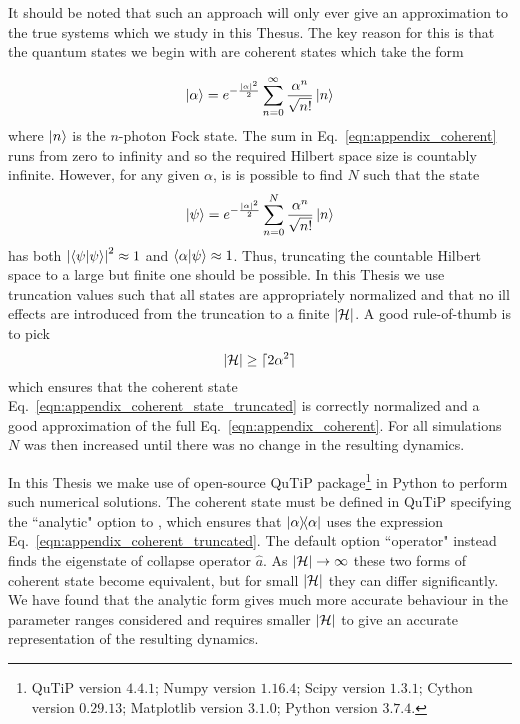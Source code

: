 It should be noted that such an approach will only ever give an approximation to the true systems which we study in this Thesus. The key reason for this is that the quantum states we begin with are coherent states which take the form

\begin{equation}\label{eqn:appendix_coherent}
\ket{\alpha} = e^{-\frac{\left|\alpha\right|^2}{2}}\sum_{n=0}^\infty \frac{\alpha^n}{\sqrt{n!}}\ket{n}
\end{equation}
where $\ket{n}$ is the $n$-photon Fock state. %
The sum in Eq.~\ref{eqn:appendix_coherent} runs from zero to infinity and so the required Hilbert space size is countably infinite. However, for any given $\alpha$, is is possible to find $N$ such that the state
\begin{equation}\label{eqn:appendix_coherent_state_truncated}
\ket{\psi} = e^{-\frac{\left|\alpha\right|^2}{2}}\sum_{n=0}^N \frac{\alpha^n}{\sqrt{n!}}\ket{n}
\end{equation} 
has both $\left| \ip{\psi} \right|^2 \approx 1$ and $\ip{\alpha}{\psi} \approx 1$. Thus, truncating the countable Hilbert space to a large but finite one should be possible. In this Thesis we use truncation values such that all states are appropriately normalized and that no ill effects are introduced from the truncation to a finite $\left|\mathcal{H}\right|$. A good rule-of-thumb is to pick
\begin{equation}\label{eqn:rule_of_thumb}
\left|\mathcal{H}\right| \ge \lceil 2 \alpha^2 \rceil
\end{equation}
which ensures that the coherent state Eq.~\ref{eqn:appendix_coherent_state_truncated} is correctly normalized and a good approximation of the full Eq.~\ref{eqn:appendix_coherent}. For all simulations $N$ was then increased until there was no change in the resulting dynamics.

In this Thesis we make use of open-source QuTiP package\footnote{QuTiP version $4.4.1$; Numpy version $1.16.4$; Scipy version $1.3.1$; Cython version $0.29.13$; Matplotlib version $3.1.0$; Python version $3.7.4$.} \cite{qutip2} in Python to perform such numerical solutions. The coherent state must be defined in QuTiP specifying the ``analytic" option to , which ensures that $\dyad{\alpha}$ uses the expression Eq.~\ref{eqn:appendix_coherent_truncated}. The default option ``operator" instead finds the eigenstate of collapse operator $\hat{a}$. As $\left|\mathcal{H}\right| \rightarrow \infty$ these two forms of coherent state become equivalent, but for small $\left|\mathcal{H}\right|$ they can differ significantly. We have found that the analytic form gives much more accurate behaviour in the parameter ranges considered and requires smaller $\left|\mathcal{H}\right|$ to give an accurate representation of the resulting dynamics.

